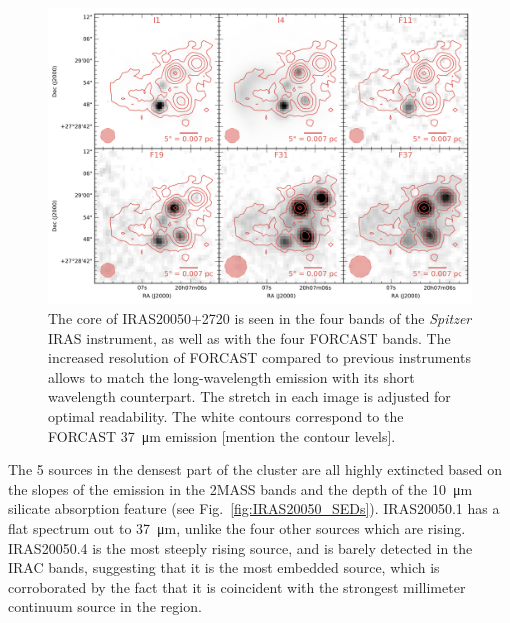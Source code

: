 \begin{landscape}
\begin{figure}
\begin{center}
\includegraphics[width=1.3\textwidth]{Figures/IRAS20050.png}
\caption[Multi-wavelength view of the IRAS~20050+2720 core]{The core of IRAS20050+2720 is seen in the four bands of the \textit{Spitzer} IRAS instrument, as well as with the four FORCAST bands. The increased resolution of FORCAST compared to previous instruments allows to match the long-wavelength emission with its short wavelength counterpart. The stretch in each image is adjusted for optimal readability. The white contours correspond to the FORCAST \SI{37}{\micro\meter} emission [mention the contour levels]. }
\label{fig:IRAS20050_mosaic}
\end{center}
\end{figure}
\end{landscape}

The 5 sources in the densest part of the cluster are all highly extincted based on the slopes of the emission in the 2MASS bands and the depth of the \SI{10}{\um} silicate absorption feature (see Fig.~\ref{fig:IRAS20050_SEDs}). IRAS20050.1 has a flat spectrum out to \SI{37}{\um}, unlike the four other sources which are rising. IRAS20050.4 is the most steeply rising source, and is barely detected in the IRAC bands, suggesting that it is the most embedded source, which is corroborated by the fact that it is coincident with the strongest millimeter continuum source in the region. 


